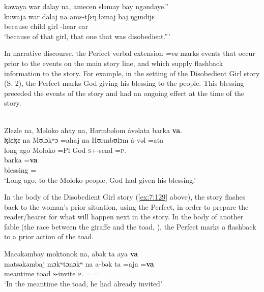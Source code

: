       \medskip
      \clearpage
kəwaya  war  dalay  na, amecen  sləmay  bay  ngəndəye.”\\      
\gll kuwaja war dalaj na amɛ-tʃɛŋ ɬəmaj baj ŋgɪndijɛ\\
     because child girl {\PSP} {\DEP}-hear ear {\NEG}  {\DEM}\\
\glt  ‘because of that girl, that one that was disobedient.”’\\
\z 

In narrative discourse, the Perfect verbal extension \textit{=va} marks events that occur prior to the events on the main story line, and which supply flashback information to the story. For example, in the setting of the Disobedient Girl story (S. 2), the Perfect marks God giving his blessing to the people. This blessing preceded the events of the story  and had an ongoing effect at the time of the story. 


\ea\label{ex:7:143}\\
Zlezle  na,  Məloko  ahay  na,  Hərmbəlom  ávəlata  barka  \textbf{va}.\\
\gll  ɮlɛɮɛ      na   Mʊlɔkʷɔ  =ahaj  na  Hʊrmbʊlɔm  á-vəl         =ata \\ 
      {long ago}  {\PSP}   Moloko  =Pl {\PSP}  God  \textsc{s}+{\IFV}-send  =\textsc{p}.{\IO}\\  
      
      \medskip
\gll barka   =\textbf{va}\\
     blessing   ={\PRF}\\
\glt  ‘Long ago, to the Moloko people, God had given his blessing.’\\
\z 

In the body of the Disobedient Girl story (\ref{ex:7:129} above), the story flashes back to the woman’s prior situation, using the Perfect, in order to prepare the reader/hearer for what will happen next in the story. In the body of another fable (the race between the giraffe and the toad, \citealt{Friesen2003}), the Perfect marks a flashback to a prior action of the toad.

\ea\label{ex:7:144}
Macəkəmbay  moktonok  na,  abək  ta  aya  \textbf{va}\\  
\gll  matsəkəmbaj  mɔkʷtɔnɔkʷ   na  a-bək  ta  =aja  =\textbf{va}\\  
      meantime toad {\PSP} \textsc{s}-invite \textsc{p}.{\DO} ={\PLU} ={\PRF}\\ 
\glt ‘In the meantime the toad, he had already invited’\\

